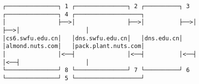 \documentclass[varwidth=70cm,crop]{standalone}
\begin{document}
\begin{verbatim}
┌───────────────┐ 1 ┌───────────────┐ 2 ┌──────────┐ 3 ┌───────────────┐ 4 ┌───────────────────┐
│               ├──>│               ├──>│          ├──>│               ├──>│                   │
│cs6.swfu.edu.cn│   │dns.swfu.edu.cn│   │dns.edu.cn│   │almond.nuts.com│   │pack.plant.nuts.com│
│               │<──┤               │<──┤          │<──┤               │<──┤                   │
└───────────────┘ 8 └───────────────┘ 7 └──────────┘ 6 └───────────────┘ 5 └───────────────────┘
\end{verbatim}
\end{document}
